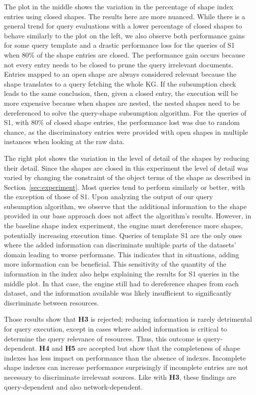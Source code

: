 The plot in the middle shows the variation in the percentage of shape index entries using closed shapes.
The results here are more nuanced.
While there is a general trend for query evaluations with a lower percentage of closed shapes to behave similarly to the plot on the left, we also observe both performance gains for some query template and a drastic performance loss for the queries of S1 when 80\% of the shape entries are closed.
The performance gain occurs because not every entry needs to be closed to prune the query irrelevant documents.
Entries mapped to an open shape are always considered relevant because the shape translates to a query fetching the whole KG.
If the subsumption check leads to the same conclusion, then, given a closed entry, the execution will be more expensive because 
when shapes are nested, the nested shapes need to be dereferenced to solve the query-shape subsumption algorithm.
For the queries of S1, with 80\% of closed shape entries, the performance lost was due to random chance, as the discriminatory entries were provided with open shapes in multiple instances when looking at the raw data.

The right plot shows the variation in the level of detail of the shapes by reducing their detail.
Since the shapes are closed in this experiment the level of detail was varied by changing the constraint of the object terms of the shape as described in Section~\ref{sec:experiment}.
Most queries tend to perform similarly or better, with the exception of those of S1.
Upon analyzing the output of our query subsumption algorithm, we observe that the additional information to the shape provided in our base approach does not affect the algorithm’s results.
However, in the baseline shape index experiment, the engine must dereference more shapes, potentially increasing execution time.
Queries of template S1 are the only ones where the added information can discriminate multiple parts of the datasets' domain leading to worse performane. This indicates that in  situations, adding more information can be beneficial.
This sensitivity of the quantity of the information in the index also helps explaining the results for S1 queries in the middle plot. 
In that case, the engine still had to dereference shapes from each dataset, and the information available was likely insufficient to significantly discriminate between resources.

 

Those results show that \textbf{H3} is rejected; reducing information is rarely detrimental for query execution, except in cases where added information is critical to determine the query relevance of resources.
Thus, this outcome is query-dependent.
\textbf{H4} and \textbf{H5} are accepted but show that the completeness of shape indexes has less impact on performance than the absence of indexes.
Incomplete shape indexes can increase performance surprisingly if incomplete entries are not necessary to discriminate irrelevant sources. 
Like with \textbf{H3}, these findings are query-dependent and also network-dependent.

